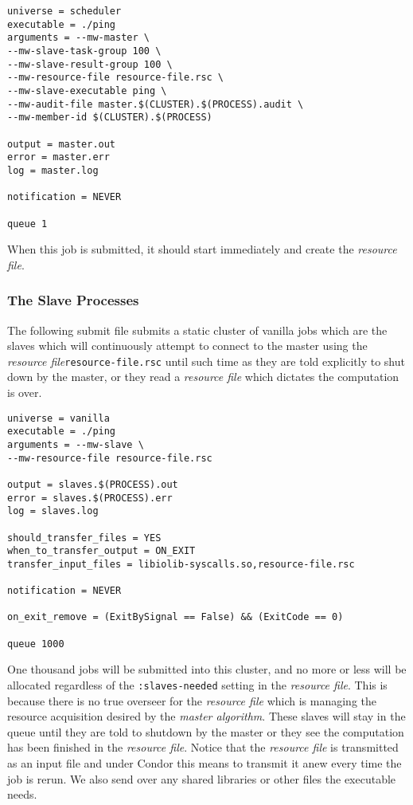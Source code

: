 \documentclass[titlepage,12pt]{book}
\newcommand{\ma}{\textit{master algorithm}\xspace}
\newcommand{\rfile}{\textit{resource file}\xspace}
\newcommand{\file}[1]{\texttt{#1}\xspace}
\begin{document}
\begin{verbatim}
universe = scheduler
executable = ./ping
arguments = --mw-master \
--mw-slave-task-group 100 \
--mw-slave-result-group 100 \
--mw-resource-file resource-file.rsc \
--mw-slave-executable ping \
--mw-audit-file master.$(CLUSTER).$(PROCESS).audit \
--mw-member-id $(CLUSTER).$(PROCESS)

output = master.out
error = master.err
log = master.log

notification = NEVER

queue 1
\end{verbatim}

When this job is submitted, it should start immediately and create the \rfile.

\subsubsection{The Slave Processes}

The following submit file submits a static cluster of vanilla jobs
which are the slaves which will continuously attempt to connect to
the master using the \rfile \file{resource-file.rsc} until such
time as they are told explicitly to shut down by the master, or they
read a \rfile which dictates the computation is over.

\begin{verbatim}
universe = vanilla
executable = ./ping
arguments = --mw-slave \
--mw-resource-file resource-file.rsc

output = slaves.$(PROCESS).out
error = slaves.$(PROCESS).err
log = slaves.log

should_transfer_files = YES
when_to_transfer_output = ON_EXIT
transfer_input_files = libiolib-syscalls.so,resource-file.rsc

notification = NEVER

on_exit_remove = (ExitBySignal == False) && (ExitCode == 0)

queue 1000
\end{verbatim}

One thousand jobs will be submitted into this cluster, and no more
or less will be allocated regardless of the \texttt{:slaves-needed}
setting in the \rfile. This is because there is no true overseer
for the \rfile which is managing the resource acquisition desired by
the \ma. These slaves will stay in the queue until they are told to
shutdown by the master or they see the computation has been finished
in the \rfile.  Notice that the \rfile is transmitted as an input
file and under Condor this means to transmit it anew every time the
job is rerun. We also send over any shared libraries or other files
the executable needs.
\end{document}
